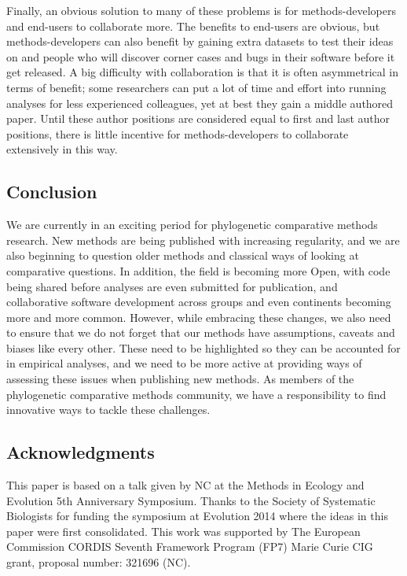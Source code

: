 \documentclass[a4paper,12pt]{article}
\begin{document}
    Finally, an obvious solution to many of these problems is for methods-developers and end-users to collaborate more. 
    The benefits to end-users are obvious, but methods-developers can also benefit by gaining extra datasets to test their ideas on and people who will discover corner cases and bugs in their software before it get released. 
    A big difficulty with collaboration is that it is often asymmetrical in terms of benefit; some researchers can put a lot of time and effort into running analyses for less experienced colleagues, yet at best they gain a middle authored paper. 
    Until these author positions are considered equal to first and last author positions, there is little incentive for methods-developers to collaborate extensively in this way.

  \subsection{Conclusion}
    We are currently in an exciting period for phylogenetic comparative methods research.
    New methods are being published with increasing regularity, and we are also beginning to question older methods and classical ways of looking at comparative questions. 
    In addition, the field is becoming more Open, with code being shared before analyses are even submitted for publication, and collaborative software development across groups and even continents becoming more and more common.
    However, while embracing these changes, we also need to ensure that we do not forget that our methods have assumptions, caveats and biases like every other. 
    These need to be highlighted so they can be accounted for in empirical analyses, and we need to be more active at providing ways of assessing these issues when publishing new methods.
    As members of the phylogenetic comparative methods community, we have a responsibility to find innovative ways to tackle these challenges. 

\subsection{Acknowledgments}
This paper is based on a talk given by NC at the Methods in Ecology and Evolution 5th Anniversary Symposium.
Thanks to the Society of Systematic Biologists for funding the symposium at Evolution 2014 where the ideas in this paper were first consolidated. 
This work was supported by The European Commission CORDIS Seventh Framework Program (FP7) Marie Curie CIG grant, proposal number: 321696 (NC).
\end{document}
